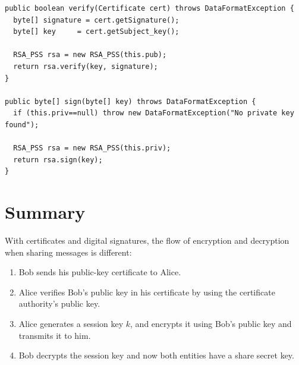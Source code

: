   \begin{lstlisting}
public boolean verify(Certificate cert) throws DataFormatException {
  byte[] signature = cert.getSignature();
  byte[] key     = cert.getSubject_key();
  
  RSA_PSS rsa = new RSA_PSS(this.pub);
  return rsa.verify(key, signature);
}

public byte[] sign(byte[] key) throws DataFormatException {
  if (this.priv==null) throw new DataFormatException("No private key found");
  
  RSA_PSS rsa = new RSA_PSS(this.priv);
  return rsa.sign(key);
}
\end{lstlisting}

\section{Summary}

With certificates and digital signatures, the flow of encryption and decryption when sharing messages is different:

\begin{enumerate}
  \item Bob sends his public-key certificate to Alice.
  \item Alice verifies Bob's public key in his certificate by using the certificate authority's public key.
  \item Alice generates a session key $k$, and encrypts it using Bob's public key and transmits it to him.
  \item Bob decrypts the session key and now both entities have a share secret key.
\end{enumerate}